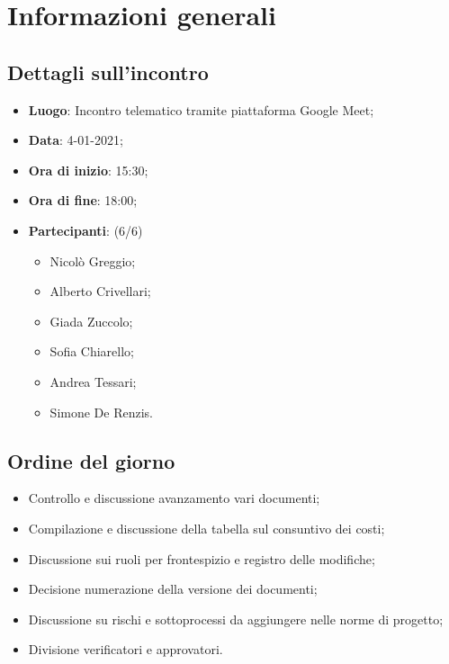 \section{Informazioni generali}

\subsection{Dettagli sull'incontro}
\begin{itemize}
\item \textbf{Luogo}: Incontro telematico tramite piattaforma Google Meet;
\item \textbf{Data}: 4-01-2021;
\item \textbf{Ora di inizio}: 15:30;
\item \textbf{Ora di fine}: 18:00;
\item \textbf{Partecipanti}: (6/6) 
\begin{itemize}
	\item Nicolò Greggio;
	\item Alberto Crivellari;
	\item Giada Zuccolo;
	\item Sofia Chiarello;
	\item Andrea Tessari;
	\item Simone De Renzis.
\end{itemize}
\end{itemize}

\subsection{Ordine del giorno}
\begin{itemize}
	\item Controllo e discussione avanzamento vari documenti;
	\item Compilazione e discussione della tabella sul consuntivo dei costi;
	\item Discussione sui ruoli per frontespizio e registro delle modifiche;
	\item Decisione numerazione della versione dei documenti;
	\item Discussione su rischi e sottoprocessi da aggiungere nelle norme di progetto;
	\item Divisione verificatori e approvatori.

\end{itemize}


